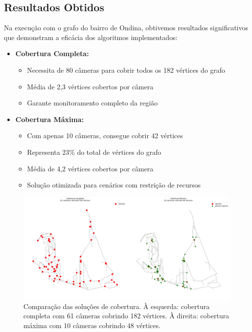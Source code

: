 \documentclass[12pt, a4paper]{report}
\begin{document}
\subsection{Resultados Obtidos}
Na execução com o grafo do bairro de Ondina, obtivemos resultados significativos que demonstram a eficácia dos algoritmos implementados:

\begin{itemize}
    \item \textbf{Cobertura Completa:}
    \begin{itemize}
        \item Necessita de 80 câmeras para cobrir todos os 182 vértices do grafo
        \item Média de 2,3 vértices cobertos por câmera
        \item Garante monitoramento completo da região
    \end{itemize}
    
    \item \textbf{Cobertura Máxima:}
    \begin{itemize}
        \item Com apenas 10 câmeras, consegue cobrir 42 vértices
        \item Representa 23\% do total de vértices do grafo
        \item Média de 4,2 vértices cobertos por câmera
        \item Solução otimizada para cenários com restrição de recursos
    \end{itemize}
\end{itemize}

\begin{figure}[H]
    \centering
    \includegraphics[width=\textwidth]{resultados/visualizacao_cobertura}
    \caption{Comparação das soluções de cobertura. À esquerda: cobertura completa com 61 câmeras cobrindo 182 vértices. À direita: cobertura máxima com 10 câmeras cobrindo 48 vértices.}
    \label{fig:visualizacao_cobertura}
\end{figure}
\end{document}
